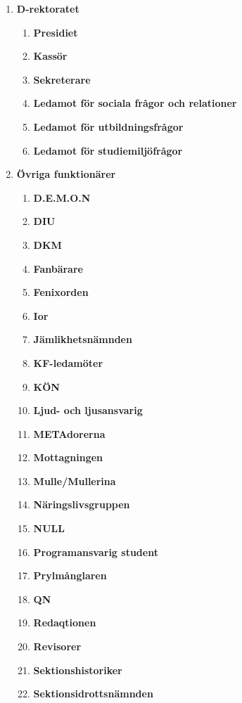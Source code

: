 \documentclass{dagordning}
\begin{document}
  \begin{enumerate}
    \item \textbf{D-rektoratet}
      \begin{enumerate}
        \item \textbf{Presidiet}
        \item \textbf{Kassör}
        \item \textbf{Sekreterare}
        \item \textbf{Ledamot för sociala frågor och relationer}
        \item \textbf{Ledamot för utbildningsfrågor}
        \item \textbf{Ledamot för studiemiljöfrågor}
      \end{enumerate}
    \item \textbf{Övriga funktionärer}
      \begin{enumerate}
        \item \textbf{D.E.M.O.N}
        \item \textbf{DIU}
        \item \textbf{DKM}
        \item \textbf{Fanbärare}
        \item \textbf{Fenixorden}
        \item \textbf{Ior}
        \item \textbf{Jämlikhetsnämnden}
        \item \textbf{KF-ledamöter}
        \item \textbf{KÖN}
        \item \textbf{Ljud- och ljusansvarig}
        \item \textbf{METAdorerna}
        \item \textbf{Mottagningen}
        \item \textbf{Mulle/Mullerina}
        \item \textbf{Näringslivsgruppen}
        \item \textbf{NULL}
        \item \textbf{Programansvarig student}
        \item \textbf{Prylmånglaren}
        \item \textbf{QN}
        \item \textbf{Redaqtionen} 
        \item \textbf{Revisorer}
        \item \textbf{Sektionshistoriker}
        \item \textbf{Sektionsidrottsnämnden}

\end{enumerate}
\end{enumerate}
\end{document}
